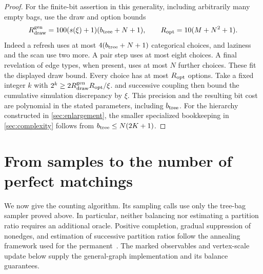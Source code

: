 \documentclass[11pt]{article}
\theoremstyle{definition}
\theoremstyle{remark}
\numberwithin{equation}{section}
\begin{document}
\begin{proof}
For the finite-bit assertion in this generality, including arbitrarily
many empty bags, use the draw and option bounds
\[
 R_{\rm draw}^{\rm gen}=100(s(\xi)+1)(b_{\rm tree}+N+1),\qquad
 R_{\rm opt}=10(M+N^2+1).
\]
Indeed a refresh uses at most $4(b_{\rm tree}+N+1)$ categorical
choices, and laziness and the scan use two more. A pair step uses at
most eight choices. A final revelation of edge types, when present,
uses at most $N$ further choices. These fit the displayed draw bound.
Every choice has at most $R_{\rm opt}$ options. Take a fixed integer
$k$ with $2^k\ge2R_{\rm draw}^{\rm gen}R_{\rm opt}/\xi$.
 and successive coupling then bound
the cumulative simulation discrepancy by $\xi$. This precision and
the resulting bit cost are polynomial in the stated parameters,
including $b_{\rm tree}$. For the hierarchy constructed in
\cref{sec:enlargement}, the smaller specialized bookkeeping in
\cref{sec:complexity} follows from
$b_{\rm tree}\le N(2K+1)$.
\end{proof}
\section{From samples to the number of perfect matchings}
\label{sec:counting}

We now give the counting algorithm. Its sampling calls use only the
tree-bag sampler proved above. In particular, neither balancing nor
estimating a partition ratio requires an additional oracle.
Positive completion, gradual suppression of nonedges, and estimation
of successive partition ratios follow the annealing framework used
for the permanent~\cite{JerrumSinclairVigoda2004}. The marked observables
and vertex-scale update below supply the general-graph implementation
and its balance guarantees.
\end{document}
